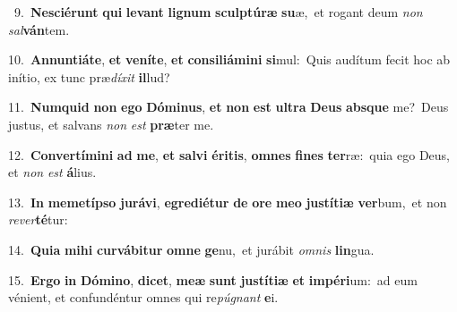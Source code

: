 {{\numbfont\textcolor{\numbcolor}{~9.}}~\-\textbf{Ne}\-\textbf{sci}\textbf{é}\textbf{runt} \textbf{qui} \textbf{le}\-\textbf{vant} \textbf{li}\-\textbf{gnum} \textbf{sculp}\-\textbf{tú}\textbf{ræ} \textbf{su}\-æ,~\star et rogant deum \textit{non} \textit{sal}\-\textbf{ván}tem.\par
{\numbfont\textcolor{\numbcolor}{10.}}~\-\textbf{An}\-\textbf{nun}\textbf{ti}\textbf{á}\textbf{te}, \textbf{et} \textbf{ve}\-\textbf{ní}\textbf{te}, \textbf{et} \textbf{con}\-\textbf{si}\textbf{li}\textbf{á}\textbf{mi}\textbf{ni} \textbf{si}\-mul:~\star Quis audítum fecit hoc ab inítio, ex tunc præ\-\textit{dí}\-\textit{xit} \textbf{il}\-lud?\par
{\numbfont\textcolor{\numbcolor}{11.}}~\-\textbf{Num}\-\textbf{quid} \textbf{non} \textbf{e}\-\textbf{go} \textbf{Dó}\-\textbf{mi}\textbf{nus}, \textbf{et} \textbf{non} \textbf{est} \textbf{ul}\-\textbf{tra} \textbf{De}\-\textbf{us} \textbf{abs}\-\textbf{que} me?~\star Deus justus, et salvans \textit{non} \textit{est} \textbf{præ}\-ter me.\par
{\numbfont\textcolor{\numbcolor}{12.}}~\-\textbf{Con}\-\textbf{ver}\textbf{tí}\textbf{mi}\textbf{ni} \textbf{ad} \textbf{me}\-, \textbf{et} \textbf{sal}\-\textbf{vi} \textbf{é}\-\textbf{ri}\textbf{tis}, \textbf{om}\-\textbf{nes} \textbf{fi}\-\textbf{nes} \textbf{ter}\-ræ:~\star quia ego Deus, et \textit{non} \textit{est} \textbf{á}\-lius.\par
{\numbfont\textcolor{\numbcolor}{13.}}~\textbf{In} \textbf{me}\-\textbf{met}\textbf{íp}\textbf{so} \textbf{ju}\-\textbf{rá}\textbf{vi}, \textbf{e}\-\textbf{gre}\textbf{di}\textbf{é}\textbf{tur} \textbf{de} \textbf{o}\-\textbf{re} \textbf{me}\-\textbf{o} \textbf{jus}\-\textbf{tí}\textbf{ti}\textbf{æ} \textbf{ver}\-bum,~\star et non \textit{re}\-\textit{ver}\textbf{té}tur:\par
{\numbfont\textcolor{\numbcolor}{14.}}~\-\textbf{Qui}\-\textbf{a} \textbf{mi}\-\textbf{hi} \textbf{cur}\-\textbf{vá}\textbf{bi}\textbf{tur} \textbf{om}\-\textbf{ne} \textbf{ge}\-nu,~\star et jurábit \textit{om}\-\textit{nis} \textbf{lin}\-gua.\par
{\numbfont\textcolor{\numbcolor}{15.}}~\-\textbf{Er}\-\textbf{go} \textbf{in} \textbf{Dó}\-\textbf{mi}\textbf{no}, \textbf{di}\-\textbf{cet}, \textbf{me}\-\textbf{æ} \textbf{sunt} \textbf{jus}\-\textbf{tí}\textbf{ti}\textbf{æ} \textbf{et} \textbf{im}\-\textbf{pé}\textbf{ri}um:~\star ad eum vénient, et confundéntur omnes qui re\-\textit{pú}\-\textit{gnant} \textbf{e}\-i.\par
}
